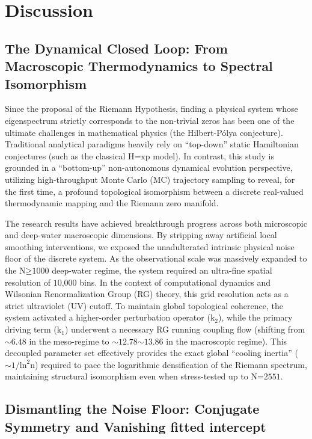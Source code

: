 \section*{Discussion}

\subsection*{The Dynamical Closed Loop: From Macroscopic Thermodynamics to Spectral Isomorphism}

Since the proposal of the Riemann Hypothesis, finding a physical system
whose eigenspectrum strictly corresponds to the non-trivial zeros has
been one of the ultimate challenges in mathematical physics (the
Hilbert-Pólya conjecture). Traditional analytical paradigms heavily rely
on ``top-down'' static Hamiltonian conjectures (such as the classical
\(\text{H}\text{=}\text{xp}\) model). In contrast, this study is
grounded in a ``bottom-up'' non-autonomous dynamical evolution
perspective, utilizing high-throughput Monte Carlo (MC) trajectory
sampling to reveal, for the first time, a profound topological
isomorphism between a discrete real-valued thermodynamic mapping and the
Riemann zero manifold.

The research results have achieved breakthrough progress across both
microscopic and deep-water macroscopic dimensions. By stripping away
artificial local smoothing interventions, we exposed the unadulterated
intrinsic physical noise floor of the discrete system. As the
observational scale was massively expanded to the
\(\text{N}\text{≥1000}\) deep-water regime, the system required an
ultra-fine spatial resolution of \(\text{10,000}\) bins. In the context
of computational dynamics and Wilsonian Renormalization Group (RG)
theory, this grid resolution acts as a strict ultraviolet (UV) cutoff.
To maintain global topological coherence, the system activated a
higher-order perturbation operator (\(\text{k}_{\text{2}}\)), while the
primary driving term (\(\text{k}_{\text{1}}\)) underwent a necessary RG
running coupling flow (shifting from \(\text{∼6.48}\) in the meso-regime
to \(\text{∼12.78∼13.86}\) in the macroscopic regime). This decoupled
parameter set effectively provides the exact global ``cooling inertia''
(\(\text{∼1/}\text{ln}^{\text{2}}\text{n}\)) required to pace the
logarithmic densification of the Riemann spectrum, maintaining
structural isomorphism even when stress-tested up to
\(\text{N}\text{=2551}\).

\subsection*{Dismantling the Noise Floor: Conjugate Symmetry and Vanishing fitted intercept}

